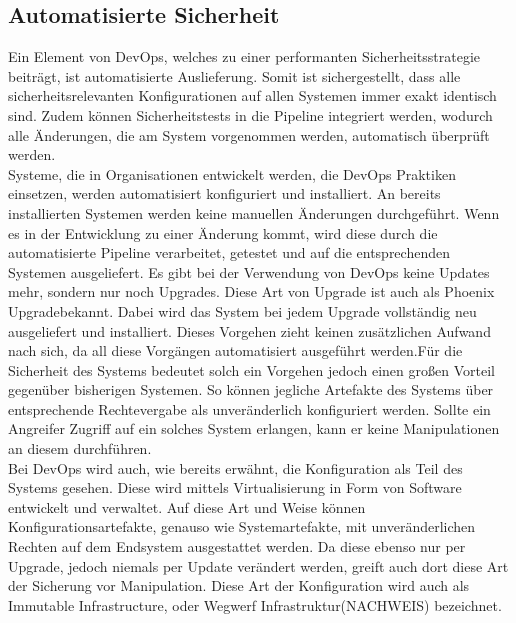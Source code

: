 \subsection{Automatisierte Sicherheit}
Ein Element von DevOps, welches zu einer performanten Sicherheitsstrategie beiträgt, ist automatisierte Auslieferung. Somit ist sichergestellt, dass alle sicherheitsrelevanten Konfigurationen auf allen Systemen immer exakt identisch sind. Zudem können Sicherheitstests in die Pipeline integriert werden, wodurch alle Änderungen, die am System vorgenommen werden, automatisch überprüft werden.\\
Systeme, die in Organisationen entwickelt werden, die DevOps Praktiken einsetzen, werden automatisiert konfiguriert und installiert. An bereits installierten Systemen werden keine manuellen Änderungen durchgeführt. Wenn es in der Entwicklung zu einer Änderung kommt, wird diese durch die automatisierte Pipeline verarbeitet, getestet und auf die entsprechenden Systemen ausgeliefert. Es gibt bei der Verwendung von DevOps keine Updates mehr, sondern nur noch Upgrades. Diese Art von Upgrade ist auch als \glqq Phoenix Upgrade\grqq bekannt. Dabei wird das System bei jedem Upgrade vollständig neu ausgeliefert und installiert. Dieses Vorgehen zieht keinen zusätzlichen Aufwand nach sich, da all diese Vorgängen automatisiert ausgeführt werden.Für die Sicherheit des Systems bedeutet solch ein Vorgehen jedoch einen großen Vorteil gegenüber bisherigen Systemen. So können jegliche Artefakte des Systems über entsprechende Rechtevergabe als unveränderlich konfiguriert werden. Sollte ein Angreifer Zugriff auf ein solches System erlangen, kann er keine Manipulationen an diesem durchführen.\\
Bei DevOps wird auch, wie bereits erwähnt, die Konfiguration als Teil des Systems gesehen. Diese wird mittels Virtualisierung in Form von Software entwickelt und verwaltet. Auf diese Art und Weise können Konfigurationsartefakte, genauso wie Systemartefakte, mit unveränderlichen Rechten auf dem Endsystem ausgestattet werden. Da diese ebenso nur per Upgrade, jedoch niemals per Update verändert werden, greift auch dort diese Art der Sicherung vor Manipulation. Diese Art der Konfiguration wird auch als \glqq Immutable Infrastructure\grqq, oder \glqq Wegwerf Infrastruktur\grqq (NACHWEIS) bezeichnet.\\
